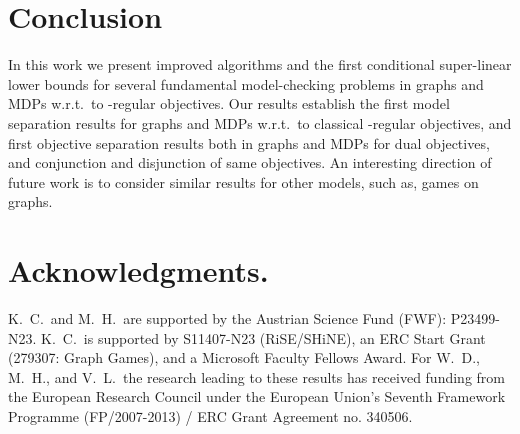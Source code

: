 \documentclass[11pt,letterpaper]{article}
\begin{document}
\section{Conclusion}\label{sec:conclusion}
In this work we present improved algorithms and the first conditional
super-linear lower bounds for several fundamental model-checking 
problems in graphs and MDPs w.r.t.\ to -regular objectives. 
Our results establish the first model separation results for graphs
and MDPs w.r.t.\ to classical -regular objectives, and first 
objective separation results both in graphs and MDPs for dual objectives,
and conjunction and disjunction of same objectives.
An interesting direction of future work is to consider similar results
for other models, such as, games on graphs.



\section*{Acknowledgments.}
K.~C.\ and M.~H.\ are supported by the Austrian Science Fund (FWF): P23499-N23.
K.~C.\ is supported by S11407-N23 (RiSE/SHiNE), an ERC Start Grant (279307: Graph Games), and a Microsoft Faculty Fellows Award.
For W.~D., M.~H., and V.~L.\ the research leading to these results has received funding from the 
European Research Council under the European Union's Seventh Framework Programme 
(FP/2007-2013) / ERC Grant Agreement no. 340506.

\end{document}
